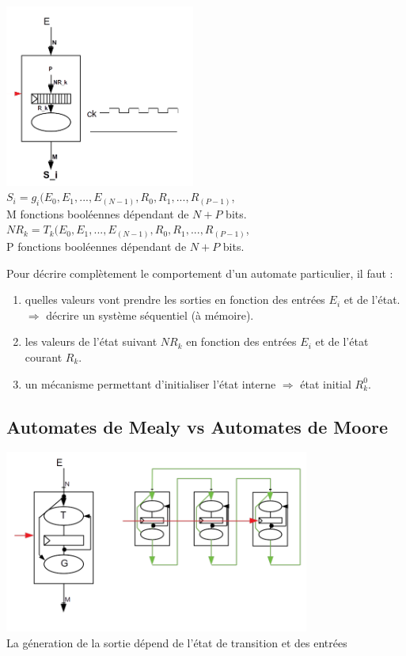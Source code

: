 \documentclass[10pt]{article}
\begin{document}
\begin{center}

  \includegraphics[height=6cm]{./pics/automata.png}
  \(S_i=g_i(E_0,E_1,...,E_{(N-1)},R_0, R_1,...,R_{(P-1)}\), \\
  M fonctions booléennes dépendant de $N+P$ bits. \\
  \(NR_k=T_k(E_0,E_1,...,E_{(N-1)},R_0, R_1,...,R_{(P-1)}\), \\
  P fonctions booléennes dépendant de $N+P$ bits. \\
\end{center}

Pour décrire complètement le comportement d'un automate particulier, il faut :
\begin{enumerate}
  \item quelles valeurs vont prendre les sorties en fonction des entrées $E_i$ et
  de l'état. $\Rightarrow$ décrire un système séquentiel (à mémoire).
  \item les valeurs de l'état suivant $NR_k$ en fonction des entrées $E_i$ et de
  l'état courant $R_k$.
  \item un mécanisme permettant d'initialiser l'état interne $\Rightarrow$ état
  initial $R_k^{0}$.
\end{enumerate}

\subsection{Automates de Mealy vs Automates de Moore}

\begin{center}
  \includegraphics[height=6cm]{./pics/mealy.png}
  \\La géneration de la sortie dépend de l'état de transition et des entrées
\end{center}
\end{document}

